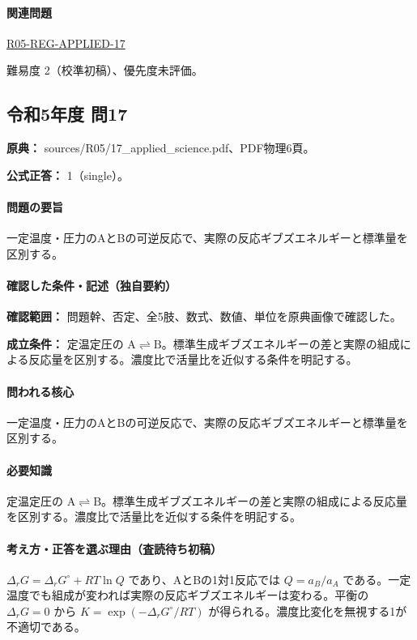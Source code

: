 \paragraph{関連問題} \hyperref[q:r05-reg-applied-17]{R05-REG-APPLIED-17}

\par 難易度 2（校準初稿）、優先度未評価。

\subsection{令和5年度 問17}
\label{q:r05-reg-applied-17}

\noindent\textbf{原典：} sources/R05/17\_applied\_science.pdf、PDF物理6頁。

\textbf{公式正答：} 1（single）。

\paragraph{問題の要旨} 一定温度・圧力のAとBの可逆反応で、実際の反応ギブズエネルギーと標準量を区別する。

\paragraph{確認した条件・記述（独自要約）}\mbox{}\par

\noindent\textbf{確認範囲：} 問題幹、否定、全5肢、数式、数値、単位を原典画像で確認した。\par

\noindent\textbf{成立条件：} 定温定圧の \(\mathrm{A\rightleftharpoons B}\)。標準生成ギブズエネルギーの差と実際の組成による反応量を区別する。濃度比で活量比を近似する条件を明記する。\par

\paragraph{問われる核心} 一定温度・圧力のAとBの可逆反応で、実際の反応ギブズエネルギーと標準量を区別する。

\paragraph{必要知識} 定温定圧の \(\mathrm{A\rightleftharpoons B}\)。標準生成ギブズエネルギーの差と実際の組成による反応量を区別する。濃度比で活量比を近似する条件を明記する。

\paragraph{考え方・正答を選ぶ理由（査読待ち初稿）} \(\Delta_rG=\Delta_rG^\circ+RT\ln Q\) であり、AとBの1対1反応では \(Q=a_B/a_A\) である。一定温度でも組成が変われば実際の反応ギブズエネルギーは変わる。平衡の \(\Delta_rG=0\) から \(K=\exp(-\Delta_rG^\circ/RT)\) が得られる。濃度比変化を無視する1が不適切である。

